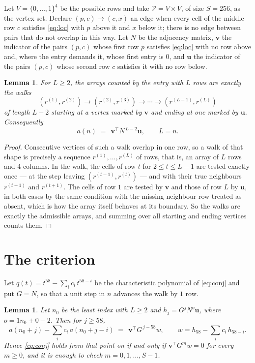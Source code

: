 \documentclass[11pt,a4paper]{article}
\theoremstyle{plain}
\newtheorem{lemma}[theorem]{Lemma}
\theoremstyle{definition}
\begin{document}
Let $V=\{0,\dots,1\}^{4}$ be the possible rows and take
$\mathcal V=V\times V$, of size $S=256$, as the vertex set. Declare $(p,c)\to(c,x)$ an edge
when every cell of the middle row $c$ satisfies \eqref{eq:loc} with $p$ above it and $x$
below it; there is no edge between pairs that do not overlap in this way. Let $N$ be the
adjacency matrix, $\mathbf{v}$ the indicator of the pairs $(p,c)$ whose first row $p$
satisfies \eqref{eq:loc} with no row above and, where the entry demands it, whose first entry is $0$, and $\mathbf{u}$ the indicator of
the pairs $(p,c)$ whose second row $c$ satisfies it with no row below.

\begin{lemma}\label{lem:walk}
For $L\ge2$, the arrays counted by the entry with $L$ rows are exactly the walks
\[
(r^{(1)},r^{(2)})\to(r^{(2)},r^{(3)})\to\cdots\to(r^{(L-1)},r^{(L)})
\]
of length $L-2$ starting at a vertex marked by $\mathbf{v}$ and ending at one marked by
$\mathbf{u}$. Consequently
\[
a(n)\;=\;\,\mathbf{v}^{\!\top}N^{\,L-2}\mathbf{u},\qquad L=n .
\]
\end{lemma}

\begin{proof}
Consecutive vertices of such a walk overlap in one row, so a walk of that shape is
precisely a sequence $r^{(1)},\dots,r^{(L)}$ of rows, that is, an array of $L$ rows
and $4$ columns. In the walk, the cells of row $t$ for $2\le t\le L-1$ are tested
exactly once --- at the step leaving $(r^{(t-1)},r^{(t)})$ --- and with their true
neighbours $r^{(t-1)}$ and $r^{(t+1)}$. The cells of row $1$ are tested by
$\mathbf{v}$ and those of row $L$ by $\mathbf{u}$, in both cases by the same condition
with the missing neighbour row treated as absent, which is how the array itself behaves at
its boundary. So the walks are exactly the admissible arrays, and summing over all starting
and ending vertices counts them.
\end{proof}

\section{The criterion}

Let $q(t)=t^{58}-\sum_i c_i\,t^{58-i}$ be the characteristic polynomial of
\eqref{eq:conj} and put $G=N$, so that a unit step in $n$ advances the walk by
$1$ row.

\begin{lemma}\label{lem:crit}
Let $n_0$ be the least index with $L\ge2$ and $h_j=G^{j}N^{o}\mathbf{u}$, where
$o=1n_0+0-2$. Then for $j\ge58$,
\[
a(n_0+j)-\sum_i c_i\,a(n_0+j-i)\;=\;\,\mathbf{v}^{\!\top}G^{\,j-58}w,
\qquad w=h_{58}-\sum_i c_i\,h_{58-i} .
\]
Hence \eqref{eq:conj} holds from that point on if and only if
$\mathbf{v}^{\!\top}G^{m}w=0$ for every $m\ge0$, and it is enough to check
$m=0,1,\dots,S-1$.
\end{lemma}
\end{document}
